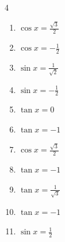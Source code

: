 \begin{multicols}{4}
\begin{enumerate}

  \item $\displaystyle \cos{x}  = \frac{\sqrt{3}}{2}$


  \item $\displaystyle \cos{x}  = -\frac{1}{2}$


  \item $\displaystyle \sin{x}  = \frac{1}{\sqrt{2}}$


  \item $\displaystyle \sin{x}  = -\frac{1}{2}$


  \item $\displaystyle \tan{x}  = 0$

        \phantom{$\displaystyle x = 0 , \pi$}

  \item $\displaystyle \tan{x}  = -1$


  \item $\displaystyle \cos{x}  = \frac{\sqrt{3}}{2}$


  \item $\displaystyle \tan{x}  = -1$


\columnbreak %

  \item $\displaystyle \tan{x}  = \frac{1}{\sqrt{3}}$


  \item $\displaystyle \tan{x}  = -1$


  \item $\displaystyle \sin{x}  = \frac{1}{2}$


\end{enumerate}
\end{multicols}
